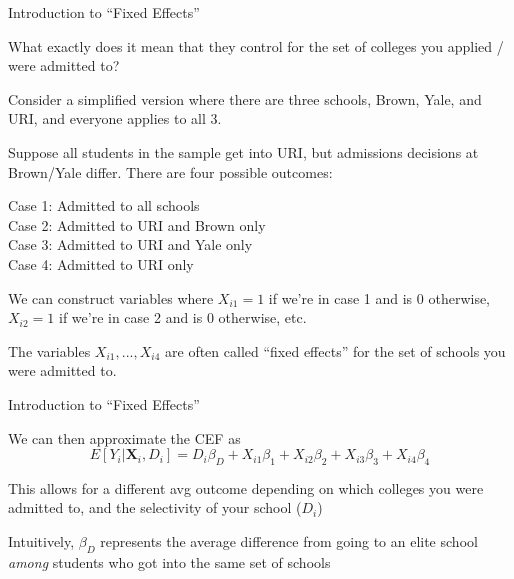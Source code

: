 \documentclass[11pt,english,handout]{beamer}
\newenvironment{wideitemize}{\itemize\addtolength{\itemsep}{10pt}}{\enditemize}
\begin{document}
\begin{frame}{Introduction to ``Fixed Effects''}

\begin{wideitemize}
	\item
	What exactly does it mean that they control for the set of colleges you applied / were admitted to?
	
	\pause
	\item
	Consider a simplified version where there are three schools, Brown, Yale, and URI, and everyone applies to all 3. 
	
	
	\pause
	\item
	Suppose all students in the sample get into URI, but admissions decisions at Brown/Yale differ. There are four possible outcomes: \\ \pause
	
	Case 1: Admitted to all schools \\
	Case 2: Admitted to URI and Brown only \\
	Case 3: Admitted to URI and Yale only \\
	Case 4: Admitted to URI only \\
	
	\pause
	\item
	We can construct variables where $X_{i1} = 1$ if we're in case 1 and is 0 otherwise, $X_{i2} = 1$ if we're in case 2 and is 0 otherwise, etc. 
	
	
	\pause
	\item
	The variables $X_{i1},...,X_{i4}$ are often called ``fixed effects'' for the set of schools you were admitted to.
	
	
\end{wideitemize}
\end{frame} 

\begin{frame}{Introduction to ``Fixed Effects''}
	
\begin{wideitemize}
	\item
	We can then approximate the CEF as 
	$$E[Y_i | \bm{X}_i , D_i ] = D_i \beta_D  + X_{i1} \beta_1 + X_{i2} \beta_2 + X_{i3} \beta_3 + X_{i4} \beta_4 $$
	
	\pause
	\item This allows for a different avg outcome depending on which colleges you were admitted to, and the selectivity of your school ($D_i $)
	
	\pause
	\item
	Intuitively, $\beta_D$ represents the average difference from going to an elite school \textit{among} students who got into the same set of schools
\end{wideitemize}	
	
\end{frame}
\end{document}
